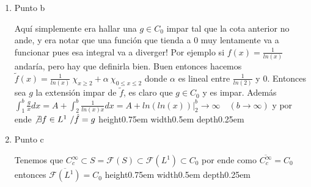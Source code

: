 \documentclass[11pt,a4paper,oneside]{article}
\newcommand{\F}{\mathcal{F}}
\newenvironment{proof}[1][Demostraci\'on]{\begin{trivlist}
\item[\hskip \labelsep {\bfseries #1}]}{\end{trivlist}}
\newcommand{\qed}{\nobreak \ifvmode \relax \else
      \ifdim\lastskip<1.5em \hskip-\lastskip
      \hskip1.5em plus0em minus0.5em \fi \nobreak
      \vrule height0.75em width0.5em depth0.25em\fi}
\begin{document}
\begin{proof}
\begin{enumerate}
\item {Punto b}

Aqu\'i simplemente era hallar una $g \in C_0$ impar tal que la cota anterior no ande, y era notar que una funci\'on que tienda a $0$ muy lentamente va a funcionar pues esa integral va a diverger! Por ejemplo si $f(x) = \frac{1}{ln(x)}$ andar\'ia, pero hay que definirla bien. Buen entonces hacemos $\tilde{f}(x) = \frac{1}{ln(x)} \ \chi_{x \geq 2} + \alpha \ \chi_{0 \leq x \leq 2}$ donde $\alpha$ es lineal entre $\frac{1}{ln(2)}$ y $0$. Entonces sea $g$ la extensi\'on impar de $\tilde{f}$, es claro que $g \in C_0$ y es impar. Adem\'as $\int_{1}^{b}{\frac{g}{x} dx} = A +  \int_{2}^{b}{\frac{1}{ln(x)x} dx} = A + ln(ln(x))|_{2}^{b} \rightarrow \infty \quad (b \rightarrow \infty)$ y por ende $\not \exists f \in L^1 \ / \hat{f}=g$ \qed

\item {Punto c}

Tenemos que $C_{c}^{\infty} \subset S =\mathcal{F}(S) \subset \F(L^1) \subset C_0$ por ende como $\overline{C_{c}^{\infty}}=C_0$ entonces $\overline{\F(L^1)}=C_0$ \qed

\end{enumerate}

\end{proof}
\end{document}
